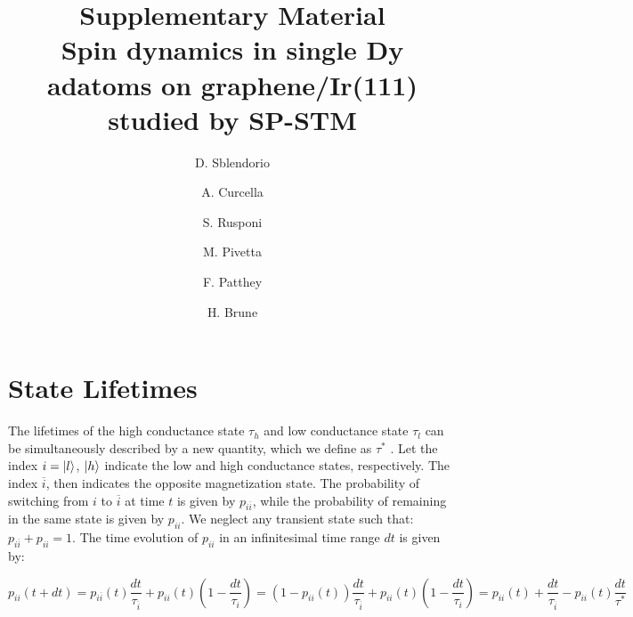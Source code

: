 \documentclass[reprint,amsmath,amssymb,aps,nofootinbib,onecolumn]{revtex4-2}
\begin{document}
\title{Supplementary Material\\Spin dynamics in single Dy adatoms on graphene/Ir(111)
studied by SP-STM}

\author{D. Sblendorio}

\author{A. Curcella}

\author{S. Rusponi}

\author{M. Pivetta}

\author{F. Patthey}

\author{H. Brune}

\maketitle

\section{State Lifetimes}
The lifetimes of the high conductance state $\tau_{h}$ and low conductance state $\tau_{l}$ can be simultaneously described by a new quantity, which we define as $\tau^{*}$ \citep{Khajetoorians2013}. Let the index $i=\ket{l}$, $\ket{h}$ indicate the low and high conductance states, respectively. The index $\overline{i}$, then indicates the opposite magnetization state. The probability of switching from $ i$ to $\overline{i} $ at time $t$ is given by $ p_{i \overline{i}} $, while the probability of remaining in the same state is given by $ p_{ii} $. We neglect any transient state such that: $ p_{i\overline{i}} + p_{ii} = 1$. The time evolution of $ p_{ii} $ in an infinitesimal time range $dt$ is given by:

\begin{equation}
p_{ii}(t+dt)=p_{i\overline{i}}(t)\frac{dt}{\tau_{\overline{i}}}+p_{ii}(t)\left( 1-\frac{dt}{\tau_i} \right)=(1-p_{ii}(t))\frac{dt}{\tau_{\overline{i}}}+p_{ii}(t)\left( 1-\frac{dt}{\tau_i} \right)=p_{ii}(t)+\frac{dt}{\tau_{\overline{i}}}-p_{ii}(t)\frac{dt}{\tau^*}
\label{eq:prob_dt}
\end{equation}
\end{document}
